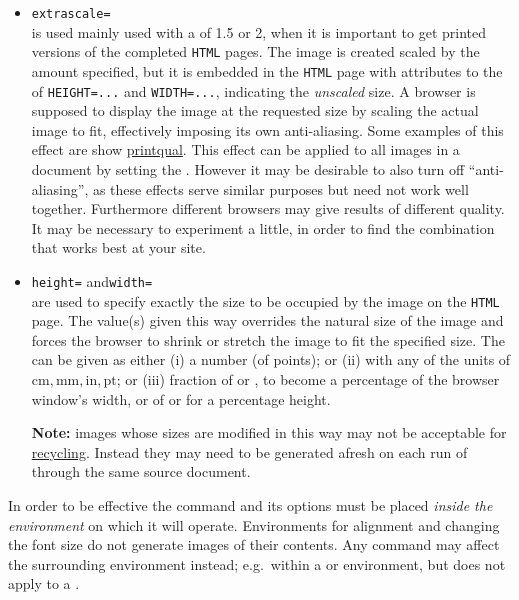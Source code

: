 \begin{itemize}
%
\item \texttt{extrascale=}\\
is used mainly used with a  of 1.5 or 2, when it is 
important to get printed versions of the completed \texttt{HTML} pages. 
The image is created scaled by the amount specified, but it is embedded 
in the \texttt{HTML} page with attributes to the  of
\texttt{HEIGHT=...} and \texttt{WIDTH=...}, 
indicating the \emph{unscaled} size. 
A browser is supposed to display the image at the requested size
by scaling the actual image to fit, 
effectively imposing its own anti-aliasing.
Some examples of this effect are show 
\hyperref{here}{later, in Section~}{}{printqual}.
This effect can be applied to all images in a document by setting
the  .
However it may be desirable to also turn off ``anti-aliasing'', 
as these effects serve similar purposes but need not work well together. 
Furthermore different browsers may give results of different quality.
It may be necessary to experiment a little,
in order to find the combination that works best at your site.

%
\item \texttt{height=}\quad
 and\quad\texttt{width=}\\
are used to specify exactly the size to be occupied by the image
on the \texttt{HTML} page. The value(s) given this way overrides
the natural size of the image and forces the browser to shrink or
stretch the image to fit the specified size.
The  can be given as either (i) a number (of points);
or (ii) with any of the units of $\mathrm{cm, mm, in, pt}$;
or (iii) fraction of  or ,
to become a percentage of the browser window's width,
or of  or  for a percentage height.

\noindent
\textbf{Note:} images whose sizes are modified in this way may not 
be acceptable for 
\hyperref{image-recycling}{image-recycling, (see page~}{)}{recycling}. 
Instead they may need to be generated afresh on each run of \latextohtml{} 
through the same source document.
%
\end{itemize}

\medskip\noindent
In order to be effective the  command 
and its options must be placed \emph{inside the environment} 
on which it will operate.
Environments for alignment and changing the font size do not
generate images of their contents. Any 
command may affect the surrounding environment instead;
e.g.\ within a  or  environment,
but does not apply to a .


